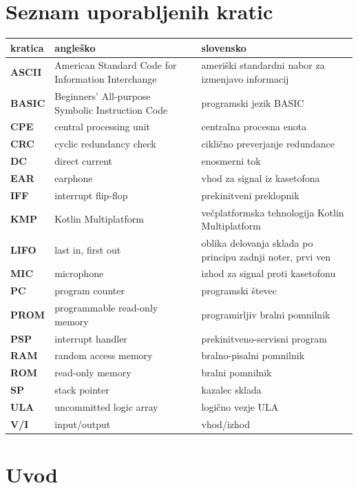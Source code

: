 \documentclass[a4paper, 12pt, openright]{book}
\newcommand{\tkratice}{%
\chapter*{Seznam uporabljenih kratic}

\noindent
\begin{tabular}{p{0.12\textwidth}|p{.37\textwidth}|p{.43\textwidth}}
    {\bf kratica} & {\bf angleško}                                     & {\bf slovensko}                                            \\
    \hline
    {\bf ASCII}   & American Standard Code for Information Interchange & ameriški standardni nabor za izmenjavo informacij          \\
    {\bf BASIC}   & Beginners' All-purpose Symbolic Instruction Code   & programski jezik BASIC                                     \\
    {\bf CPE}     & central processing unit                            & centralna procesna enota                                   \\
    {\bf CRC}     & cyclic redundancy check                            & ciklično preverjanje redundance                            \\
    {\bf DC}      & direct current                                     & enosmerni tok                                              \\
    {\bf EAR}     & earphone                                           & vhod za signal iz kasetofona                               \\
    {\bf IFF}     & interrupt flip-flop                                & prekinitveni preklopnik                                    \\
    {\bf KMP}     & Kotlin Multiplatform                               & večplatformska tehnologija Kotlin Multiplatform            \\
    {\bf LIFO}    & last in, first out                                 & oblika delovanja sklada po principu zadnji noter, prvi ven \\
    {\bf MIC}     & microphone                                         & izhod za signal proti kasetofonu                           \\
    {\bf PC}      & program counter                                    & programski števec                                          \\
    {\bf PROM}    & programmable read-only memory                      & programirljiv bralni pomnilnik                             \\
    {\bf PSP}     & interrupt handler                                  & prekinitveno-servisni program                              \\
    {\bf RAM}     & random access memory                               & bralno-pisalni pomnilnik                                   \\
    {\bf ROM}     & read-only memory                                   & bralni pomnilnik                                           \\
    {\bf SP}      & stack pointer                                      & kazalec sklada                                             \\
    {\bf ULA}     & uncommitted logic array                            & logično vezje ULA                                          \\
    {\bf V/I}     & input/output                                       & vhod/izhod                                                 \\
\end{tabular}

\clearemptydoublepage }
\begin{document}

    \newcommand{\tpovzetek}{Diplomsko delo obravnava emulacijo računalnika
    Sinclair ZX Spectrum 48K z dodanim vpogledom v notranje stanje sistema. Namen
    dela je bil razviti emulator, ki ne omogoča le zagona programov za ZX
    Spectrum, temveč tudi pregled in spreminjanje vrednosti registrov, zastavic, pomnilnika
    ter razstavljenih ukazov. V delu so predstavljeni zgodovinski pomen
    računalnika ZX Spectrum, njegova strojna zgradba, pomnilniška organizacija, procesor
    Z80, vezje ULA, zaslon, tipkovnica, kasetni podsistem in upravljanje zvoka.
    Emulator je implementiran kot namizna aplikacija, ki podpira emulacijo sistema
    in razhroščevalni uporabniški vmesnik. Delovanje je ovrednoteno z zagonom
    izbranih programov in iger ter s testnimi programi delovanja procesorja Z80. Rezultat
    dela je delujoč emulator, uporaben za poganjanje stare programske opreme, razumevanje
    delovanja sistema in digitalno ohranjanje računalniške dediščine.}

    \newcommand{\tabstract}{This thesis addresses the emulation of the Sinclair
    ZX Spectrum 48K computer with insight into the internal state of the system. The
    goal was to develop an emulator that not only runs programs for the ZX Spectrum,
    but also allows inspection and modification of register values, flags,
    memory and disassembled instructions. The thesis presents the historical importance
    of the ZX Spectrum, its hardware architecture, memory organization, Z80
    processor, ULA chip, display, keyboard, tape subsystem and sound control. The
    emulator is implemented as a desktop application that supports system emulation
    and a debugging user interface. Its operation is evaluated by running
    selected programs and games, and with test programs for the Z80 processor.
    The result is a working emulator, useful for running legacy software,
    understanding the operation of the system and digitally preserving computing
    heritage.}


    
    \tkratice
    \mainmatter
    \setcounter{page}{1}
    \pagestyle{fancy}

    \chapter{Uvod}
\end{document}
